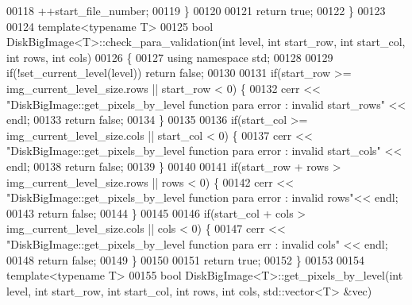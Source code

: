 \begin{DoxyCode}
00118                 ++start\_file\_number;
00119         \}
00120 
00121         \textcolor{keywordflow}{return} \textcolor{keyword}{true};
00122 \}
00123 
00124 \textcolor{keyword}{template}<\textcolor{keyword}{typename} T>
00125 \textcolor{keywordtype}{bool} DiskBigImage<T>::check_para_validation(\textcolor{keywordtype}{int} level, \textcolor{keywordtype}{int} start\_row, \textcolor{keywordtype}{int} 
      start\_col, \textcolor{keywordtype}{int} rows, \textcolor{keywordtype}{int} cols) 
00126 \{
00127         \textcolor{keyword}{using namespace }std;
00128 
00129         \textcolor{keywordflow}{if}(!set\_current\_level(level)) \textcolor{keywordflow}{return} \textcolor{keyword}{false};
00130 
00131         \textcolor{keywordflow}{if}(start\_row >= img\_current\_level\_size.rows || start\_row < 0) \{
00132                 cerr << \textcolor{stringliteral}{"DiskBigImage::get\_pixels\_by\_level function para error
       : invalid start\_rows"} << endl;
00133                 \textcolor{keywordflow}{return} \textcolor{keyword}{false};
00134         \}
00135 
00136         \textcolor{keywordflow}{if}(start\_col >= img\_current\_level\_size.cols || start\_col < 0) \{
00137                 cerr << \textcolor{stringliteral}{"DiskBigImage::get\_pixels\_by\_level function para error
       : invalid start\_cols"} << endl;
00138                 \textcolor{keywordflow}{return} \textcolor{keyword}{false};
00139         \}
00140 
00141         \textcolor{keywordflow}{if}(start\_row + rows > img\_current\_level\_size.rows || rows < 0) \{
00142                 cerr << \textcolor{stringliteral}{"DiskBigImage::get\_pixels\_by\_level function para error
       : invalid rows"}<< endl;
00143                 \textcolor{keywordflow}{return} \textcolor{keyword}{false};
00144         \}
00145 
00146         \textcolor{keywordflow}{if}(start\_col + cols > img\_current\_level\_size.cols || cols < 0) \{
00147                 cerr << \textcolor{stringliteral}{"DiskBigImage::get\_pixels\_by\_level function para err :
       invalid cols"} << endl;
00148                 \textcolor{keywordflow}{return} \textcolor{keyword}{false};
00149         \}
00150 
00151         \textcolor{keywordflow}{return} \textcolor{keyword}{true};
00152 \}
00153 
00154 \textcolor{keyword}{template}<\textcolor{keyword}{typename} T>
00155 \textcolor{keywordtype}{bool} DiskBigImage<T>::get_pixels_by_level(\textcolor{keywordtype}{int} level, \textcolor{keywordtype}{int} start\_row, \textcolor{keywordtype}{int} 
      start\_col, \textcolor{keywordtype}{int} rows, \textcolor{keywordtype}{int} cols, std::vector<T> &vec)

\end{DoxyCode}
